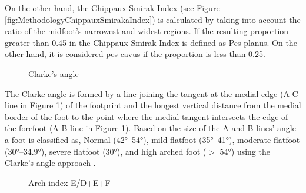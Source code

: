 On the other hand, the Chippaux-Smirak Index (see Figure \ref{fig:MethodologyChippauxSmirakaIndex}) is calculated by taking into account the ratio of the midfoot's narrowest and widest regions. If the  resulting proportion greater than 0.45 in the Chippaux-Smirak Index is defined as Pes planus. On the other hand, it is considered pes cavus \cite{almaawi2019flatfoot} if the proportion is less than 0.25.

\begin{figure}[htbp]
\centering
{}
\caption{Clarke's angle \cite{ozer2012evaluation}}
\label{fig:MethodologyClarkesAngle}
\end{figure}

The Clarke angle is formed by a line joining the tangent at the medial edge (A-C line in Figure \ref{fig:MethodologyClarkesAngle}) of the footprint and the longest vertical distance from the medial border of the foot to the point where the medial tangent intersects the edge of the forefoot (A-B line in Figure \ref{fig:MethodologyClarkesAngle}). Based on the size of the A and B lines’ angle a foot is classified as, Normal (42°–54°), mild flatfoot (35°–41°), moderate flatfoot (30°–34.9°), severe flatfoot (30°), and high arched foot ($>$ 54°) using the Clarke's angle approach \cite{hegazy2021comparing}.

\begin{figure}[htbp]
\centering
{}
\caption{Arch index E/D+E+F \cite{ozer2012evaluation}}
\label{fig:MethodologyArchIndex}
\end{figure}

